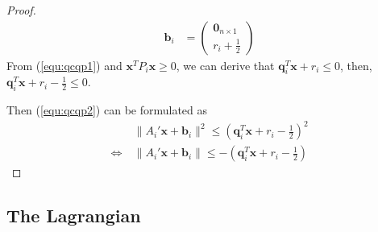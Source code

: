 \begin{proof}
\begin{align}
            \mathbf{b}_i &= \left(
                \begin{array}{ll}
                    \mathbf{0}_{n\times1} \\
                    r_i + \frac{1}{2}
                \end{array}\right)
    \end{align}
    From (\ref{equ:qcqp1}) and $\mathbf{x}^T P_i \mathbf{x} \geq 0$,
    we can derive that $\mathbf{q}_i^T \mathbf{x} + r_i \leq 0$,
    then, $\mathbf{q}_i^T \mathbf{x} + r_i - \frac{1}{2} \leq 0$.
    \par
    Then (\ref{equ:qcqp2}) can be formulated as
    \begin{align}
        &\parallel A_i'\mathbf{x} + \mathbf{b}_i \parallel^2
        \leq (\mathbf{q}_i^T \mathbf{x} + r_i - \frac{1}{2})^2 \\
        \Leftrightarrow \ & \parallel A_i'\mathbf{x} + \mathbf{b}_i \parallel
        \leq -(\mathbf{q}_i^T \mathbf{x} + r_i - \frac{1}{2})
    \end{align}
\end{proof}

\subsection{The Lagrangian}